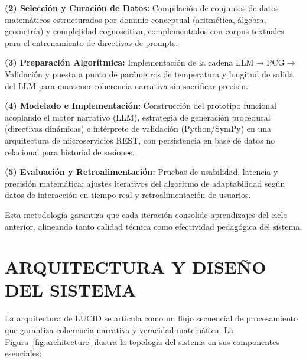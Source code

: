 \documentclass{ieeetj}
\begin{document}
\textbf{(2) Selecci\'on y Curaci\'on de Datos:} Compilaci\'on de conjuntos de datos matem\'aticos estructurados por dominio conceptual
(aritm\'etica, \'algebra, geometr\'ia) y complejidad cognoscitiva, complementados con corpus textuales para el entrenamiento de directivas de prompts.

\textbf{(3) Preparaci\'on Algor\'itmica:} Implementaci\'on de la cadena LLM$\rightarrow$PCG$\rightarrow$Validaci\'on y puesta a punto de par\'ametros
de temperatura y longitud de salida del LLM para mantener coherencia narrativa sin sacrificar precisin.

\textbf{(4) Modelado e Implementaci\'on:} Construcci\'on del prototipo funcional acoplando el motor narrativo (LLM),
estrategia de generaci\'on procedural (directivas din\'amicas) e int\'erprete de validaci\'on (Python/SymPy) en una arquitectura
de microservicios REST, con persistencia en base de datos no relacional para historial de sesiones.

\textbf{(5) Evaluaci\'on y Retroalimentaci\'on:} Pruebas de usabilidad, latencia y precisi\'on matem\'atica; ajustes iterativos
del algoritmo de adaptabilidad seg\'un datos de interacci\'on en tiempo real y retroalimentaci\'on de usuarios.

Esta metodolog\'ia garantiza que cada iteraci\'on consolide aprendizajes del ciclo anterior, alineando tanto calidad t\'ecnica
como efectividad pedag\'ogica del sistema.

\section{ARQUITECTURA Y DISE\~NO DEL SISTEMA}
La arquitectura de LUCID se articula como un flujo secuencial de procesamiento que garantiza coherencia narrativa y veracidad
matem\'atica. La Figura~\ref{fig:architecture} ilustra la topolog\'ia del sistema en sus componentes esenciales:
\end{document}
